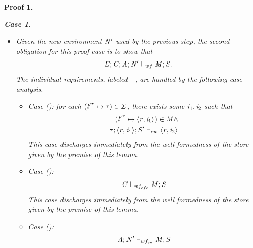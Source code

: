 \documentclass[showabstract,showacknowledgments,showpreface,showdedication]{iuphd}
\newtheorem*{bcase}{Case}
\theoremstyle{nonumberplain}
\newtheorem{nproof}{Proof}
\begin{document}
\begin{nproof}
\begin{bcase}
\begin{itemize}
    $\locreg{\loc}{\reg} \not \in \NENV'$, and $\AENV(\reg) = \locreg{\loc}{\reg}$,
    which altogether satisfy the requirements of \tfunctiondef{}.
    Now, by application of the Substitution Lemma,
    we have that
    \begin{align*}
    \emptytenv;\SENV;\CENV;\AENV;\NENV' \vdash \AENV; \NENV'; \subst{\EXPR}{\overharpoon{\var_1}}{\overharpoon{\VAL_1}} \subst{}{\overharpoon{\locreg{\loc'_1}{\reg'}}}{\overharpoon{\locreg{\loc_1}{\reg}}} \ldots \subst{}{\overharpoon{\var_n}}{\overharpoon{\VAL_n}} \subst{}{\overharpoon{\locreg{\loc'_n}{\reg'}}}{\overharpoon{\locreg{\loc_n}{\reg}}} : \tyatlocreg{\TYP}{\loc}{\reg}.
    \end{align*}
    \item Given the new environment $\mathit{N}'$
    used by the previous step, the second obligation
    for this proof case is to show that
    \begin{displaymath}
    \mathit{\Sigma};\mathit{C};\mathit{A};\mathit{N}' \vdash_{wf} \mathit{M};\mathit{S}.
    \end{displaymath}
    The individual requirements, labeled 
     -
        ,
        are handled by the following case analysis.
    \begin{itemize}
      \item
      Case ():
      for each $({\mathit{l}'}^{\mathit{r}} \mapsto \mathit{\tau}) \in \mathit{\Sigma}$, there exists some $\mathit{i}_1, \mathit{i}_2$ such that
      \begin{align}
      ({\mathit{l}'}^{\mathit{r}} \mapsto \langle \mathit{r}, \mathit{i}_1 \rangle ^{}) \in \mathit{M} \wedge \\
        \mathit{\tau};\langle \mathit{r}, \mathit{i}_1 \rangle ^{};\mathit{S}' \vdash_{ew} \langle \mathit{r}, \mathit{i}_2 \rangle ^{} 
      \end{align}
      This case discharges immediately from the well formedness of the store
      given by the premise of this lemma.
      \item Case ():
      \begin{align*}
      \mathit{C} \vdash_{wf_{cfc}} \mathit{M};\mathit{S}
      \end{align*}
      This case discharges immediately from the well formedness of the store
      given by the premise of this lemma.
      \item Case ():
      \begin{align*}
      \storewfca{\AENV}{\NENV'}{\MENV}{\STOR}

\end{align*}
\end{itemize}
\end{itemize}
\end{bcase}
\end{nproof}
\end{document}
